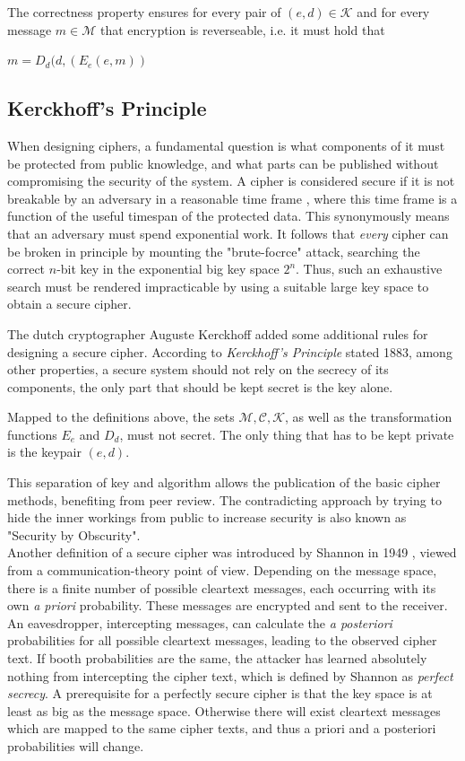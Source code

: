  The correctness property ensures for every pair of $(e,d) \in \mathcal{K}$ and for every message $m \in \mathcal{M}$ that encryption is reverseable, i.e. 
 it must hold that 
 \begin{center}  
 $ m = D_d(d, (E_e(e, m))$
  \end{center}

\subsection{Kerckhoff's Principle}

When designing ciphers, a fundamental question is what components of it must be protected from public knowledge, and what parts can be published without
compromising the security of the system. A cipher is considered secure if it is not breakable by an adversary in a reasonable time frame \cite{handbook1}, where
this time frame is a function of the useful timespan of the protected data. This synonymously means that an adversary must spend exponential work.
It follows that \textit{every} cipher can be broken in principle by
mounting the "brute-focrce" attack, searching the correct $n$-bit key in the exponential big key space $2^n$. Thus, such an exhaustive search must be rendered impracticable by 
using a suitable large key space to obtain a secure cipher.

The dutch cryptographer Auguste Kerckhoff added some additional rules for designing a secure cipher.
According to \textit{Kerckhoff's Principle} stated 1883, among other properties, a secure system should not rely on the secrecy of
its components, the only part that should be kept secret is the key alone.  

Mapped to the definitions above, the sets $\mathcal{M, C, K}$, as well as the
transformation functions $E_e$ and $D_d$, must not secret. The only thing that has to be kept private is the keypair $(e, d)$.

This separation of key and algorithm allows the publication of the basic cipher methods, benefiting from peer review. The contradicting approach by trying
to hide the inner workings from public to increase security is also known as "Security by Obscurity".
\\

Another definition of a secure cipher was introduced by Shannon in 1949 \cite{6769090}, viewed from a communication-theory point of view. Depending on the
message space, there is a finite number of possible cleartext messages, each occurring with its own \textit{a priori} probability. These messages are encrypted
and sent to the receiver. An eavesdropper, intercepting messages, can calculate the \textit{a posteriori} probabilities for all possible cleartext messages, 
leading to the observed cipher text. If booth probabilities are the same, the attacker has learned absolutely nothing from intercepting the cipher text, which
is defined by Shannon as \textit{perfect secrecy}. A prerequisite for a perfectly secure cipher is that the key space is at least as big as the message space.
Otherwise there will exist cleartext messages which are mapped to the same cipher texts, and thus a priori and a posteriori probabilities will change.
\\

